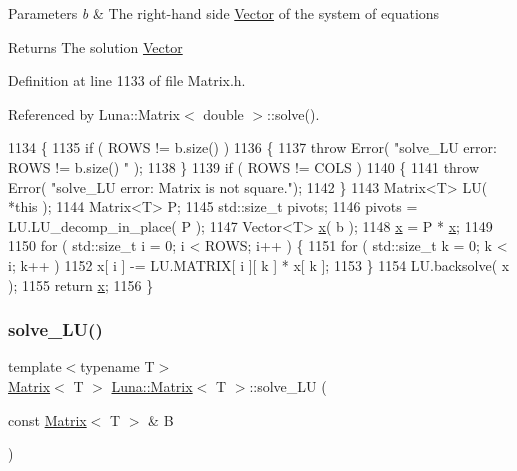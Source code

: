 \begin{DoxyParams}{Parameters}
{\em b} & The right-\/hand side \hyperlink{classLuna_1_1Vector}{Vector} of the system of equations \\
\hline
\end{DoxyParams}
\begin{DoxyReturn}{Returns}
The solution \hyperlink{classLuna_1_1Vector}{Vector} 
\end{DoxyReturn}


Definition at line 1133 of file Matrix.\+h.



Referenced by Luna\+::\+Matrix$<$ double $>$\+::solve().


\begin{DoxyCode}
1134   \{
1135     \textcolor{keywordflow}{if} ( ROWS != b.size() )
1136     \{
1137       \textcolor{keywordflow}{throw} Error( \textcolor{stringliteral}{"solve\_LU error: ROWS != b.size() "} );
1138     \}
1139     \textcolor{keywordflow}{if} ( ROWS != COLS )
1140     \{
1141       \textcolor{keywordflow}{throw} Error( \textcolor{stringliteral}{"solve\_LU error: Matrix is not square."});
1142     \}
1143     Matrix<T> LU( *\textcolor{keyword}{this} );
1144     Matrix<T> P;
1145     std::size\_t pivots;
1146     pivots = LU.LU\_decomp\_in\_place( P );
1147     Vector<T> \hyperlink{namespaceHeat__plot_aa88370c16b85b784ccbde3ed88bc1991}{x}( b );
1148     \hyperlink{namespaceHeat__plot_aa88370c16b85b784ccbde3ed88bc1991}{x} = P * \hyperlink{namespaceHeat__plot_aa88370c16b85b784ccbde3ed88bc1991}{x};
1149 
1150     \textcolor{keywordflow}{for} ( std::size\_t i = 0; i < ROWS; i++ ) \{
1151         \textcolor{keywordflow}{for} ( std::size\_t k = 0; k < i; k++ )
1152             x[ i ] -= LU.MATRIX[ i ][ k ] * x[ k ];
1153     \}
1154     LU.backsolve( x );
1155     \textcolor{keywordflow}{return} \hyperlink{namespaceHeat__plot_aa88370c16b85b784ccbde3ed88bc1991}{x};
1156   \}
\end{DoxyCode}
\mbox{\label{classLuna_1_1Matrix_a312b9899c2857c2028f72146d607df8b}} 
\subsubsection{\texorpdfstring{solve\+\_\+\+L\+U()}{solve\_LU()}\hspace{0.1cm}{\footnotesize\ttfamily [2/2]}}
{\footnotesize\ttfamily template$<$typename T$>$ \\
\hyperlink{classLuna_1_1Matrix}{Matrix}$<$ T $>$ \hyperlink{classLuna_1_1Matrix}{Luna\+::\+Matrix}$<$ T $>$\+::solve\+\_\+\+LU (\begin{DoxyParamCaption}\item[{const \hyperlink{classLuna_1_1Matrix}{Matrix}$<$ T $>$ \&}]{B }\end{DoxyParamCaption})\hspace{0.3cm}{\ttfamily [inline]}}



